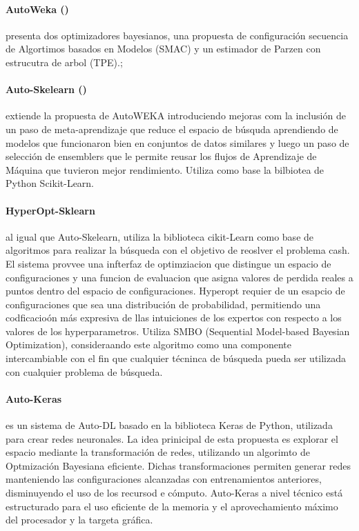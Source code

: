       \paragraph{AutoWeka (\cite{thornton2013auto})} presenta dos optimizadores bayesianos, una propuesta de configuraci\'on secuencia de Algortimos basados en Modelos (SMAC) y un estimador de Parzen con estrucutra de arbol (TPE).;

      \paragraph*{Auto-Skelearn (\cite{feurer2015efficient})} extiende la propuesta de AutoWEKA  introduciendo mejoras com la inclusi\'on de un paso de meta-aprendizaje que reduce el espacio de b\'usquda aprendiendo de modelos que funcionaron bien en conjuntos de datos similares y luego un paso de selecci\'on de ensemblers que le permite reusar los flujos de Aprendizaje de M\'aquina que tuvieron mejor rendimiento. Utiliza como base la bilbiotea de Python Scikit-Learn.

      \paragraph*{HyperOpt-Sklearn} al igual que Auto-Skelearn, utiliza la biblioteca cikit-Learn como base de algoritmos para realizar la b\'usqueda con el objetivo de reoslver el problema cash. El sistema provvee una infterfaz de optimziacion que distingue un espacio de configuraciones y una funcion de evaluacion que asigna valores de perdida reales a puntos dentro del espacio de configuraciones. Hyperopt requier de un esapcio  de configuraciones que sea una distribuci\'on de probabilidad, permitiendo una codficacio\'on m\'as expresiva de llas intuiciones de los expertos con respecto a los valores de los hyperparametros. Utiliza SMBO (Sequential Model-based Bayesian Optimization), consideraando este algoritmo como una componente intercambiable con el fin que cualquier t\'ecninca de b\'usqueda pueda ser utilizada con cualquier problema de b\'usqueda.

      \paragraph*{Auto-Keras} es un sistema de Auto-DL basado en la biblioteca Keras de Python, utilizada para crear redes neuronales.  La idea prinicipal de esta propuesta es explorar el espacio mediante la transformaci\'on de redes, utilizando un algorimto de Optmizaci\'on Bayesiana eficiente. Dichas transformaciones permiten generar redes manteniendo las configuraciones alcanzadas con entrenamientos anteriores, disminuyendo el uso de los recursod e c\'omputo. Auto-Keras a nivel t\'ecnico est\'a estructurado para el uso eficiente de la memoria y el aprovechamiento m\'aximo del procesador y la targeta gr\'afica.

